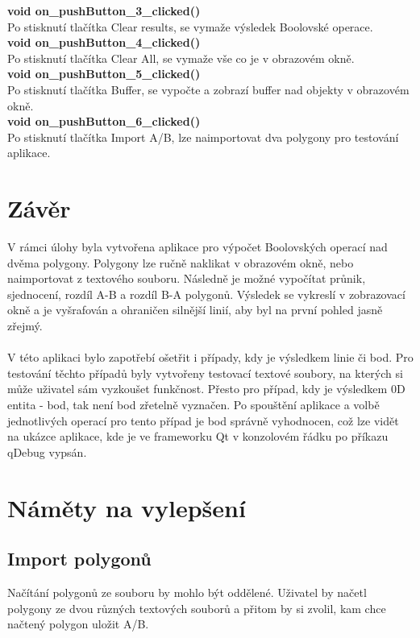 \documentclass[a4paper, 12pt]{article}
\begin{document}
\textbf{void on\_pushButton\_3\_clicked()}\\
Po stisknutí tlačítka Clear results, se vymaže výsledek Boolovské operace.\\

\textbf{void on\_pushButton\_4\_clicked()}\\
Po stisknutí tlačítka Clear All, se vymaže vše co je v obrazovém okně.\\

\textbf{void on\_pushButton\_5\_clicked()}\\
Po stisknutí tlačítka Buffer, se vypočte a zobrazí buffer nad objekty v obrazovém okně.\\

\textbf{void on\_pushButton\_6\_clicked()}\\
Po stisknutí tlačítka Import A/B, lze naimportovat dva polygony pro testování aplikace.\\




\clearpage
\section{Závěr}
V rámci úlohy byla vytvořena aplikace pro výpočet Boolovských operací nad dvěma polygony. Polygony lze ručně naklikat v obrazovém okně, nebo naimportovat z textového souboru. Následně je možné vypočítat průnik, sjednocení, rozdíl A-B a rozdíl B-A polygonů. Výsledek se vykreslí v zobrazovací okně a je vyšrafován a ohraničen silnější linií, aby byl na první pohled jasně zřejmý.\\
\\
V této aplikaci bylo zapotřebí ošetřit i případy, kdy je výsledkem linie či bod. Pro testování těchto případů byly vytvořeny testovací textové soubory, na kterých si může uživatel sám vyzkoušet funkčnost. Přesto pro případ, kdy je výsledkem 0D entita - bod, tak není bod zřetelně vyznačen. Po spouštění aplikace a volbě jednotlivých operací pro tento případ je bod správně vyhodnocen, což lze vidět na ukázce aplikace, kde je ve frameworku Qt v konzolovém řádku po příkazu qDebug vypsán. \\


\section{Náměty na vylepšení}
\subsection{Import polygonů}
Načítání polygonů ze souboru by mohlo být oddělené. Uživatel by načetl polygony ze dvou různých textových souborů a přitom by si zvolil, kam chce načtený polygon uložit A/B.
\end{document}
